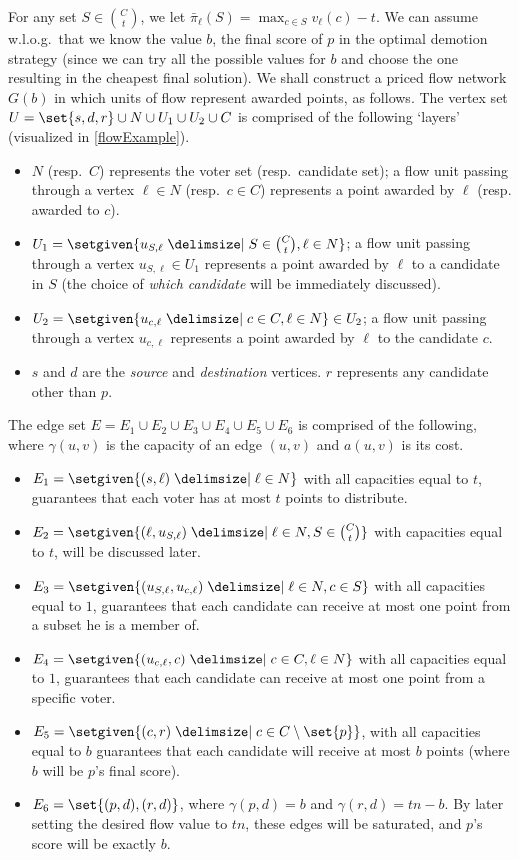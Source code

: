 \documentclass[letterpaper]{article} %
\newcommand{\Cmp}{C \setminus \set{p}}
\begin{document}
For any set $S \in \binom{C}{t}$, we let $\bar{\pi}_{\ell}(S)=\max_{c \in S}v_\ell(c)-t$.
We can assume w.l.o.g.\ that we know the value $b$, the final score of $p$ in the optimal demotion strategy (since we can try all the possible values for $b$ and choose the one resulting in the cheapest final solution).
We shall construct a priced flow network $G(b)$ in which units of flow represent awarded points, as follows. The vertex set  $U = \set{s,d,r} \cup N \cup U_1 \cup U_2 \cup C$ is comprised of the following `layers' (visualized in \cref{flowExample}).
\begin{itemize}
    \item $N$ (resp.\ $C$) represents the voter set (resp.\ candidate set); a flow unit passing through a vertex $\ell \in N$ (resp.\ $c \in C$) represents a point awarded by $\ell$ (resp. awarded to $c$).
    \item $U_1 = \setgiven{u_{S,\ell} \given S \in \binom{C}{t}, \ell \in N}$; a flow unit passing through a vertex $u_{S,\ell} \in U_1$ represents a point awarded by $\ell$ to a candidate in $S$ (the choice of \emph{which candidate} will be immediately discussed).
    \item $U_2 = \setgiven{u_{c,\ell} \given c \in C, \ell \in N} \in U_2$; a flow unit passing through a vertex $u_{c,\ell}$ represents a point awarded by $\ell$ to the candidate $c$.
    \item $s$ and $d$ are the \emph{source} and \emph{destination} vertices. $r$ represents any candidate other than $p$.
\end{itemize}
The edge set $E=E_1 \cup E_2 \cup E_3 \cup E_4 \cup E_5 \cup E_6$ is comprised of the following, where $\gamma(u,v)$ is the capacity of an edge $(u,v)$ and  $a(u,v)$ is its cost.
\begin{itemize}
    \item $E_1=\setgiven{(s,\ell) \given \ell \in N}$ with all capacities equal to $t$, guarantees that each voter has at most $t$ points to distribute.
    \item $E_2= \setgiven{(\ell, u_{S,\ell})\given \ell \in N, S \in \binom{C}{t}}$ with capacities equal to $t$, will be discussed later.
    \item $E_3=\setgiven{(u_{S,\ell}, u_{c,\ell})\given \ell \in N, c \in S}$ with all capacities equal to $1$, guarantees that each candidate can receive at most one point from a subset he is a member of.
    \item $E_4= \setgiven{(u_{c,\ell},c) \given c \in C, \ell \in N}$ with all capacities equal to $1$, guarantees that each candidate can receive at most one point from a specific voter.
    \item $E_5= \setgiven{(c,r) \given c \in \Cmp}$, with all capacities equal to $b$ guarantees that each candidate will receive at most $b$ points (where $b$ will be $p$'s final score).
    \item $E_6= \set{(p,d),(r,d)}$, where $\gamma(p,d)=b$ and $\gamma(r,d)=tn-b$. By later setting the desired flow value to $tn$, these edges will be saturated, and $p$'s score will be exactly $b$.
\end{itemize}
\end{document}
